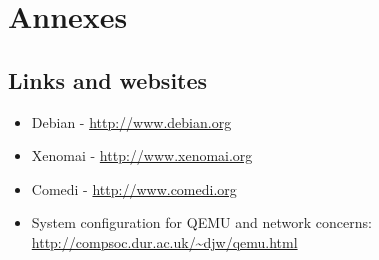 \documentclass[11pt]{book}
\begin{document}
\chapter{Annexes}

   \section{Links and websites}
   \begin{itemize}
      \item
         Debian - \url{http://www.debian.org}
      \item
         Xenomai - \url{http://www.xenomai.org}
      \item
         Comedi - \url{http://www.comedi.org}
      \item
         System configuration for QEMU and network concerns: \url{http://compsoc.dur.ac.uk/~djw/qemu.html}
   \end{itemize}





\nocite{*}
\end{document}
